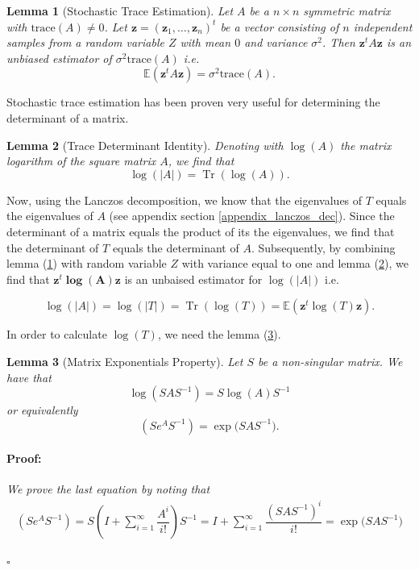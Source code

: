 \documentclass[12pt,a4paper,oneside]{book}
\newtheorem{Lemma}{Lemma}
\newenvironment{proof}{\paragraph{Proof:}}{\hfill$\square$}
\DeclareMathOperator{\Tr}{Tr}
\begin{document}
\begin{Lemma}[Stochastic Trace Estimation]\label{stoch_trace_1}
Let $A$ be a $n \times n$ symmetric matrix with $\text{trace}(A) \neq 0$. Let $\bm{z} = (\bm{z}_1, \ldots, \bm{z}_n)^t$ be a vector consisting of $n$ independent samples from a random variable $Z$ with mean $0$ and variance $\sigma^2$. Then $\bm{z}^t A \bm{z}$ is an unbiased estimator of $\sigma^2 \text{trace}(A)$ i.e. 
\begin{equation}
\mathbb{E}( \bm{z}^t A\bm{z} ) = \sigma^2 \text{trace}(A).
\end{equation}
\end{Lemma}

Stochastic trace estimation has been proven very useful for determining the determinant of a matrix.

\begin{Lemma}[Trace Determinant Identity]\label{stoch_trace_2}
Denoting with $\log(A)$ the matrix logarithm of the square matrix $A$, we find that 
\begin{equation}
\log(|A|) = \Tr (\log (A)).
\end{equation}
\end{Lemma}


Now, using the Lanczos decomposition, we know that the eigenvalues of $T$ equals the eigenvalues of $A$ (see appendix section \ref{appendix_lanczos_dec}). Since the determinant of a matrix equals the product of its the eigenvalues, we find that the determinant of $T$ equals the determinant of $A$. Subsequently, by combining lemma (\ref{stoch_trace_1}) with random variable $Z$ with variance equal to one and lemma (\ref{stoch_trace_2}), we find that $\bm{z}^t \bm{\log (A)}\bm{z} $ is an unbaised estimator for $\log(|A|)$ i.e.

\begin{equation}\label{appendix_stoch_tr_approx}
\log(|A|) = \log(|T|)= \Tr (\log (T)) = \mathbb{E}( \bm{z}^t \log (T)\bm{z} ).
\end{equation}

In order to calculate $\log (T)$, we need the lemma (\ref{appendix_matrix_lemma}).

\begin{Lemma}[Matrix Exponentials Property]\label{appendix_matrix_lemma}
Let $S$ be a non-singular matrix. We have that
\begin{equation}
\log{(S A S^{-1} )} = S \log{(A)} S^{-1}
\end{equation}
or equivalently 
\begin{equation}
(S e^{A} S^{-1} ) = \exp{(S A S^{-1}}).
\end{equation}
\begin{proof}
We prove the last equation by noting that 
\begin{align}
(S e^{A} S^{-1} )  =S \left( I + \sum\limits_{i=1}^{\infty} \dfrac{A^i}{i!} \right) S^{-1} = I + \sum\limits_{i=1}^{\infty} \dfrac{(S A S^{-1})^{i}}{i!} = \exp{(S A S^{-1}}) 
\end{align}

\end{proof}


\end{Lemma}
\end{document}
